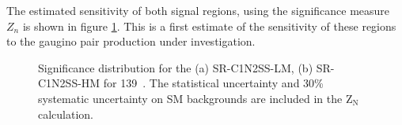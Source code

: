  The estimated sensitivity of both signal regions, using the significance measure $Z_n$ is shown in figure \ref{fig:SS:SRsign}. This is a first estimate of the sensitivity of these regions to the gaugino pair production under investigation.

\begin{figure}[!htpb]
\centering
  \caption{Significance distribution for the (a) SR-C1N2SS-LM, (b)
  SR-C1N2SS-HM for 139~\ifb. The statistical uncertainty
 and 30\% systematic uncertainty on SM backgrounds are included in the $\text{Z}_{\text{N}}$
calculation. 
\label{fig:SS:SRsign}}
\end{figure}
